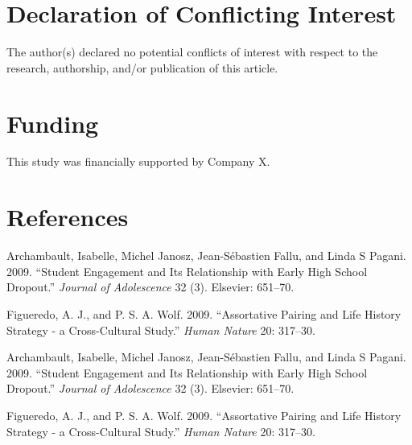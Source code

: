 \documentclass[fleqn,10pt]{JLA_article} %
\begin{document}
\hypertarget{declaration-of-conflicting-interest}{%
\section*{Declaration of Conflicting Interest}\label{declaration-of-conflicting-interest}}

The author(s) declared no potential conflicts of interest with respect to the research, authorship, and/or publication of this article.

\hypertarget{funding}{%
\section*{Funding}\label{funding}}

This study was financially supported by Company X.

\hypertarget{references}{%
\section*{References}\label{references}}

\hypertarget{refs}{}
\leavevmode\hypertarget{ref-archambault2009student}{}%
Archambault, Isabelle, Michel Janosz, Jean-Sébastien Fallu, and Linda S Pagani. 2009. ``Student Engagement and Its Relationship with Early High School Dropout.'' \emph{Journal of Adolescence} 32 (3). Elsevier: 651--70.

\leavevmode\hypertarget{ref-Figueredo:2009dg}{}%
Figueredo, A. J., and P. S. A. Wolf. 2009. ``Assortative Pairing and Life History Strategy - a Cross-Cultural Study.'' \emph{Human Nature} 20: 317--30.

\leavevmode\hypertarget{ref-archambault2009student}{}%
Archambault, Isabelle, Michel Janosz, Jean-Sébastien Fallu, and Linda S Pagani. 2009. ``Student Engagement and Its Relationship with Early High School Dropout.'' \emph{Journal of Adolescence} 32 (3). Elsevier: 651--70.

\leavevmode\hypertarget{ref-Figueredo:2009dg}{}%
Figueredo, A. J., and P. S. A. Wolf. 2009. ``Assortative Pairing and Life History Strategy - a Cross-Cultural Study.'' \emph{Human Nature} 20: 317--30.


\end{document}
